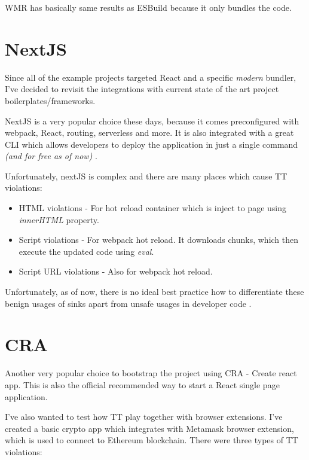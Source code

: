 WMR has basically same results as ESBuild because it only bundles the code.

\section{NextJS}

Since all of the example projects targeted React and a specific \emph{modern} bundler, I've decided
to revisit the integrations with current state of the art project boilerplates/frameworks.

NextJS is a very popular choice these days, because it comes preconfigured with webpack, React,
routing, serverless and more. It is also integrated with a great CLI which allows developers to
deploy the application in just a single command \emph{(and for free as of now)} \cite{nextjs_web}.

Unfortunately, nextJS is complex and there are many places which cause TT violations:

\begin{itemize}
  \item  HTML violations - For hot reload container which is inject to page using \emph{innerHTML}
        property.
  \item  Script violations - For webpack hot reload. It downloads chunks, which then execute the
        updated code using \emph{eval}.
  \item  Script URL violations - Also for webpack hot reload.
\end{itemize}

Unfortunately, as of now, there is no ideal best practice how to differentiate these benign usages
of sinks apart from unsafe usages in developer code \cite{tt_source_file_violation_issue}.

\section{CRA}

Another very popular choice to bootstrap the project using CRA - Create react app. This is also the
official recommended way to start a React single page application.

I've also wanted to test how TT play together with browser extensions. I've created a basic crypto
app which integrates with Metamask browser extension, which is used to connect to Ethereum
blockchain. There were three types of TT violations:

